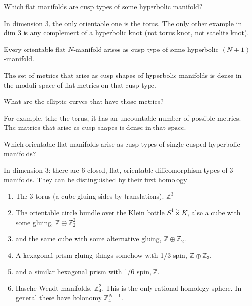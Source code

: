 \begin{remark}[Problem]
\label{remark-ferrari-problem-cusp-types}
Which flat manifolds are cusp types of some
hyperbolic manifold?
\end{remark}

In dimension 3, the only orientable one is
the torus. The only other example in dim 3 is
any complement of a hyperbolic knot (not
torus knot, not satelite knot).

\begin{theorem}[M C Reynolds, '09]
\label{theorem-ferrari-reynolds}
Every orientable flat $N$-manifold arises as
cusp type of some hyperbolic
$(N+1)$-manifold.
\end{theorem}

\begin{theorem}[Nimershwin, 90's]
\label{theorem-ferrari-nimershwin}
The set of metrics that arise as cusp shapes
of hyperbolic manifolds is dense in the
moduli space of flat metrics on that cusp
type.
\end{theorem}

\begin{remark}
\label{remark-ferrari-misha-question}
What are the elliptic curves that have those
metrics?
\end{remark}

\begin{remark}
\label{remark-ferrari-torus-metrics}
For example, take the torus, it has an
uncountable number of possible metrics. The
matrics that arise as cusp shapes is dense in
that space.
\end{remark}

\begin{remark}
\label{remark-ferrari-problem-single-cusp}
Which orientable flat manifolds arise as cusp
types of single-cusped hyperbolic manifolds?
\end{remark}

In dimension 3: there are 6 closed, flat,
orientable diffeomorphism types of
3-manifolds. They can be distinguished by
their first homology
\begin{enumerate}
\item The 3-torus (a cube gluing sides by
translations). $\mathbb{Z}^3$
\item The orientable circle bundle over the
Klein bottle $S^1\overset{\sim}{\times}K$,
also a cube with some gluing,
$\mathbb{Z}\oplus \mathbb{Z}^2_2$
\item and the same cube with some alternative
gluing, $\mathbb{Z} \oplus \mathbb{Z}_2$.
\item A hexagonal prism gluing things somehow
with 1/3 spin, $\mathbb{Z}\oplus
\mathbb{Z}_3$,
\item and a similar hexagonal prism with 1/6
spin, $\mathbb{Z}$.
\item Hasche-Wendt manifolds.
$\mathbb{Z}^2_4$. This is the only rational
homology sphere. In general these have
holonomy $\mathbb{Z}_4^{N-1}$.
\end{enumerate}

